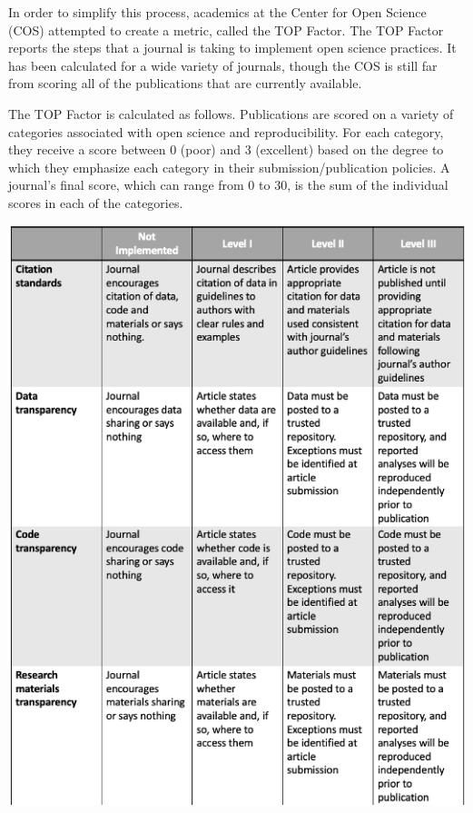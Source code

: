 \documentclass[12pt,twoside]{reedthesis}
\begin{document}
In order to simplify this process, academics at the Center for Open Science (COS) attempted to create a metric, called the TOP Factor. The TOP Factor reports the steps that a journal is taking to implement open science practices. It has been calculated for a wide variety of journals, though the COS is still far from scoring all of the publications that are currently available.

The TOP Factor is calculated as follows. Publications are scored on a variety of categories associated with open science and reproducibility. For each category, they receive a score between 0 (poor) and 3 (excellent) based on the degree to which they emphasize each category in their submission/publication policies. A journal's final score, which can range from 0 to 30, is the sum of the individual scores in each of the categories.
\begin{center}\includegraphics[width=1\linewidth]{figure/top-1} \end{center}
\end{document}
